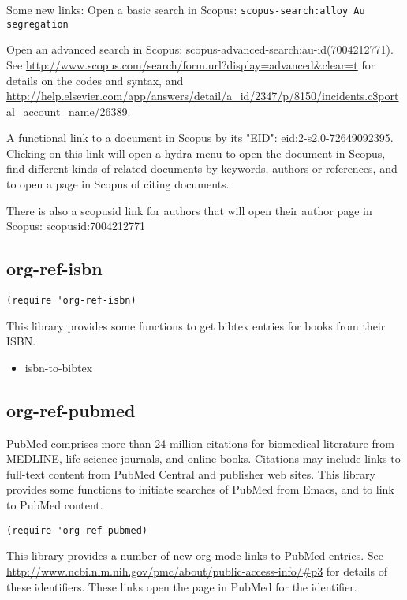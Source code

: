 \documentclass[11pt]{article}
\begin{document}
{Some new links:
Open a basic search in Scopus: \texttt{scopus-search:alloy Au segregation}

Open an advanced search in Scopus: scopus-advanced-search:au-id(7004212771). See \url{http://www.scopus.com/search/form.url?display=advanced&clear=t} for details on the codes and syntax, and \url{http://help.elsevier.com/app/answers/detail/a_id/2347/p/8150/incidents.c$portal_account_name/26389}.

A functional link to a document in Scopus by its "EID": eid:2-s2.0-72649092395. Clicking on this link will open a hydra menu to open the document in Scopus, find different kinds of related documents by keywords, authors or references, and to open a page in Scopus of citing documents.

There is also a scopusid link for authors that will open their author page in Scopus: scopusid:7004212771

\subsection{org-ref-isbn}
\label{sec-2-5}

\begin{verbatim}
(require 'org-ref-isbn)
\end{verbatim}

This library provides some functions to get bibtex entries for books from their ISBN.

\begin{itemize}
\item isbn-to-bibtex
\end{itemize}

\subsection{org-ref-pubmed}
\label{sec-2-6}

\href{http://www.ncbi.nlm.nih.gov/pubmed}{PubMed} comprises more than 24 million citations for biomedical literature from MEDLINE, life science journals, and online books. Citations may include links to full-text content from PubMed Central and publisher web sites. This library provides some functions to initiate searches of PubMed from Emacs, and to link to PubMed content.

\begin{verbatim}
(require 'org-ref-pubmed)
\end{verbatim}

This library provides a number of new org-mode links to PubMed entries. See \url{http://www.ncbi.nlm.nih.gov/pmc/about/public-access-info/#p3} for details of these identifiers. These links open the page in PubMed for the identifier.

}
\end{document}
